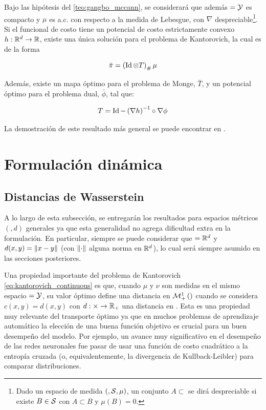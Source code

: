\begin{teo}
	Bajo las hipótesis del \autoref{teo:gangbo_mccann}, se considerará que además $=\mathcal{Y}$ es compacto y $\mu$ es a.c. con respecto a la medida de Lebesgue, con $\nabla\xspace$ despreciable\footnote{Dado un espacio de medida $(,\mathcal{S},\mu)$, un conjunto $A\subset\xspace$ se dirá despreciable si existe $B\in\mathcal{S}$ con $A\subset B$ y $\mu(B)=0$.}. Si el funcional de costo tiene un potencial de costo estrictamente convexo $h:\mathbb{R}^d\to\mathbb{R}$, existe una única solución para el problema de Kantorovich, la cual es de la forma

	\begin{equation}
		\bar\pi = \left(\operatorname{Id}\otimes T\right)_\# \mu
	\end{equation}

	Además, existe un mapa óptimo para el problema de Monge, $\bar T$, y un potencial óptimo para el problema dual, $\bar \phi$, tal que:

	\begin{equation}
		T = \operatorname{Id} - \left(\nabla h\right)^{-1}\circ \nabla\phi
	\end{equation}
\end{teo}

La demostración de este resultado más general se puede encontrar en \cite{santambrogio2019ot}.

\section{Formulación dinámica}
\label{ot/dynamic}

\subsection{Distancias de Wasserstein}
\label{ot/dynamic/wasserstein}

A lo largo de esta subsección, se entregarán los resultados para espacios métricos $(\xspace,d)$ generales ya que esta generalidad no agrega dificultad extra en la formulación. En particular, siempre se puede considerar que $=\mathbb{R}^d$ y $d(x,y)=\left\lVert x-y \right\rVert$ (con $\left\lVert \cdot \right\rVert$ alguna norma en $\mathbb{R}^d$), lo cual será siempre asumido en las secciones posteriores.

Una propiedad importante del problema de Kantorovich \eqref{eq:kantorovich_continuous} es que, cuando $\mu$ y $\nu$ son medidas en el mismo espacio $=\mathcal{Y}$, su valor óptimo define una distancia en $\mathcal{M}_+^1\left(\right)$ cuando se considera $c(x,y)=d(x,y)$ con $d:\times\to\mathbb{R}_+$ una distancia en $\xspace$. Esta es una propiedad muy relevante del transporte óptimo ya que en muchos problemas de aprendizaje automático la elección de una buena función objetivo es crucial para un buen desempeño del modelo. Por ejemplo, un avance muy significativo en el desempeño de las redes neuronales fue pasar de usar una función de costo cuadrático a la entropía cruzada (o, equivalentemente, la divergencia de Kullback-Leibler) para comparar distribuciones.

